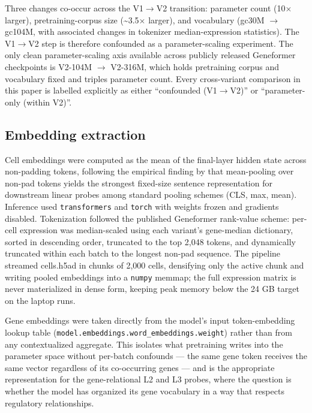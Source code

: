 \documentclass[
  11pt,
]{article}
\begin{document}
Three changes co-occur across the V1$\to$V2 transition: parameter count (10$\times$
larger), pretraining-corpus size (\textasciitilde3.5$\times$ larger), and
vocabulary (gc30M $\to$ gc104M, with associated changes in tokenizer
median-expression statistics). The V1$\to$V2 step is therefore confounded as
a parameter-scaling experiment. The only clean parameter-scaling axis
available across publicly released Geneformer checkpoints is V2-104M $\to$
V2-316M, which holds pretraining corpus and vocabulary fixed and triples
parameter count. Every cross-variant comparison in this paper is
labelled explicitly as either ``confounded (V1$\to$V2)'' or ``parameter-only
(within V2)''.

\subsection{Embedding extraction}\label{embedding-extraction}

Cell embeddings were computed as the mean of the final-layer hidden
state across non-padding tokens, following the empirical finding by
\citet{reimers2019sbert} that mean-pooling over non-pad tokens yields
the strongest fixed-size sentence representation for downstream linear
probes among standard pooling schemes (CLS, max, mean). Inference used
\texttt{transformers} \citep{wolf2020transformers} and \texttt{torch} \citep{paszke2019pytorch} with weights frozen and gradients disabled. Tokenization
followed the published Geneformer rank-value scheme: per-cell expression
was median-scaled using each variant's gene-median dictionary, sorted in
descending order, truncated to the top 2,048 tokens, and dynamically
truncated within each batch to the longest non-pad sequence. The
pipeline streamed cells.h5ad in chunks of 2,000 cells, densifying only
the active chunk and writing pooled embeddings into a \texttt{numpy}
memmap; the full expression matrix is never materialized in dense form,
keeping peak memory below the 24 GB target on the laptop runs.

Gene embeddings were taken directly from the model's input
token-embedding lookup table
(\texttt{model.embeddings.word\_embeddings.weight}) rather than from any
contextualized aggregate. This isolates what pretraining writes into the
parameter space without per-batch confounds --- the same gene token
receives the same vector regardless of its co-occurring genes --- and is
the appropriate representation for the gene-relational L2 and L3 probes,
where the question is whether the model has organized its gene
vocabulary in a way that respects regulatory relationships.
\end{document}
